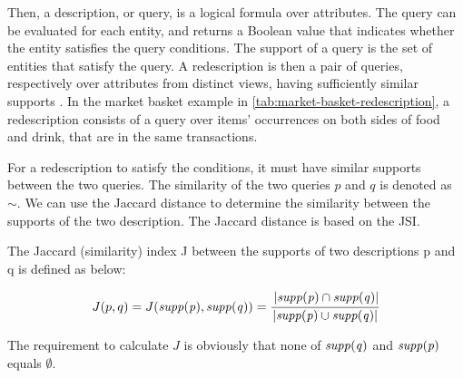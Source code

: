Then, a description, or query, is a logical formula over attributes.
The query can be evaluated for each entity, and returns a Boolean value that indicates whether the entity satisfies the query conditions.
The support of a query is the set of entities that satisfy the query.
A redescription is then a pair of queries, respectively over attributes from distinct views, having sufficiently similar supports \cite{galbrun2018redescription}.
In the market basket example in \autoref{tab:market-basket-redescription}, a redescription consists of a query over items' occurrences on both sides of food and drink, that are in the same transactions.

For a redescription to satisfy the conditions, it must have similar supports between the two queries.
The similarity of the two queries $p$ and $q$ is denoted as $\sim$.
We can use the Jaccard distance to determine the similarity between the supports of the two description.
The Jaccard distance is based on the \acl{JSI}.

\begin{definition}
    The Jaccard (similarity) index J between the supports of two descriptions p and q is defined as below:

    \begin{equation}
        J(p, q) = J(\mathit{supp({p})}, \mathit{supp({q})}) = \cfrac{\left|\mathit{supp({p})}\cap \mathit{supp({q})}\right|}{\lvert\mathit{supp({p})}\cup \mathit{supp({q})}\rvert}
    \end{equation}
\end{definition}

The requirement to calculate $J$ is obviously that none of $\mathit{supp({q})}$ and $\mathit{supp({p})}$ equals $\emptyset$.




